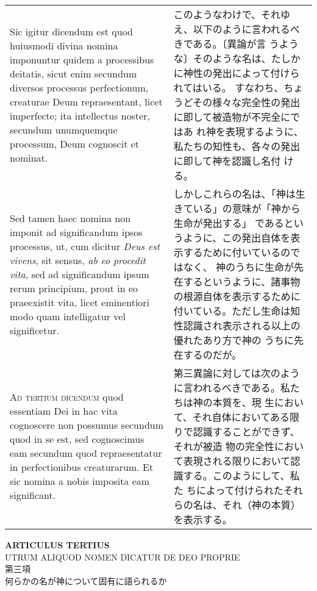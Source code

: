 \documentclass[paper=a4paper,fontsize=10pt,jafontsize=9pt,titlepage]{jlreq}
\begin{document}
\begin{longtable}{p{21em}p{21em}}
\\

Sic igitur dicendum est quod huiusmodi divina nomina imponuntur quidem
a processibus deitatis, sicut enim secundum diversos processus
perfectionum, creaturae Deum repraesentant, licet imperfecte; ita
intellectus noster, secundum unumquemque processum, Deum cognoscit et
nominat.

&

このようなわけで、それゆえ、以下のように言われるべきである。〔異論が言
うような〕そのような名は、たしかに神性の発出によって付けられてはいる。
すなわち、ちょうどその様々な完全性の発出に即して被造物が不完全にではあ
れ神を表現するように、私たちの知性も、各々の発出に即して神を認識し名付
ける。

\\

Sed tamen haec nomina non imponit ad significandum ipsos processus,
ut, cum dicitur {\itshape Deus est vivens}, sit sensus, {\itshape ab eo procedit
vita}, sed ad significandum ipsum rerum principium, prout in eo
praeexistit vita, licet eminentiori modo quam intelligatur vel
significetur.

&

しかしこれらの名は、「神は生きている」の意味が「神から生命が発出する」
であるというように、この発出自体を表示するために付いているのではなく、
神のうちに生命が先在するというように、諸事物の根源自体を表示するために
付いている。ただし生命は知性認識され表示される以上の優れたあり方で神の
うちに先在するのだが。

\\

{\scshape Ad tertium dicendum} quod essentiam Dei in hac vita cognoscere
non possumus secundum quod in se est, sed cognoscimus eam secundum
quod repraesentatur in perfectionibus creaturarum. Et sic nomina a
nobis imposita eam significant.

&

第三異論に対しては次のように言われるべきである。私たちは神の本質を、現
生において、それ自体においてある限りで認識することができず、それが被造
物の完全性において表現される限りにおいて認識する。このようにして、私た
ちによって付けられたそれらの名は、それ（神の本質）を表示する。

\end{longtable}

\newpage
{}

\begin{center}
{\Large {\bfseries ARTICULUS TERTIUS}}\\
{\large UTRUM ALIQUOD NOMEN DICATUR DE DEO PROPRIE}\\
{\large 第三項\\何らかの名が神について固有に語られるか} 
\end{center}
\end{document}
